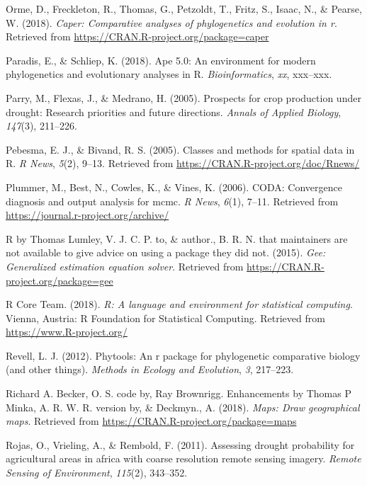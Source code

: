 \documentclass[man,floatsintext]{apa6}
\theoremstyle{definition}
\theoremstyle{definition}
\theoremstyle{definition}
\theoremstyle{remark}
\begin{document}
\leavevmode\hypertarget{ref-R-caper}{}%
Orme, D., Freckleton, R., Thomas, G., Petzoldt, T., Fritz, S., Isaac,
N., \& Pearse, W. (2018). \emph{Caper: Comparative analyses of
phylogenetics and evolution in r}. Retrieved from
\url{https://CRAN.R-project.org/package=caper}

\leavevmode\hypertarget{ref-R-ape}{}%
Paradis, E., \& Schliep, K. (2018). Ape 5.0: An environment for modern
phylogenetics and evolutionary analyses in R. \emph{Bioinformatics},
\emph{xx}, xxx--xxx.

\leavevmode\hypertarget{ref-parry2005prospects}{}%
Parry, M., Flexas, J., \& Medrano, H. (2005). Prospects for crop
production under drought: Research priorities and future directions.
\emph{Annals of Applied Biology}, \emph{147}(3), 211--226.

\leavevmode\hypertarget{ref-R-sp}{}%
Pebesma, E. J., \& Bivand, R. S. (2005). Classes and methods for spatial
data in R. \emph{R News}, \emph{5}(2), 9--13. Retrieved from
\url{https://CRAN.R-project.org/doc/Rnews/}

\leavevmode\hypertarget{ref-R-coda}{}%
Plummer, M., Best, N., Cowles, K., \& Vines, K. (2006). CODA:
Convergence diagnosis and output analysis for mcmc. \emph{R News},
\emph{6}(1), 7--11. Retrieved from
\url{https://journal.r-project.org/archive/}

\leavevmode\hypertarget{ref-R-gee}{}%
R by Thomas Lumley, V. J. C. P. to, \& author., B. R. N. that
maintainers are not available to give advice on using a package they did
not. (2015). \emph{Gee: Generalized estimation equation solver}.
Retrieved from \url{https://CRAN.R-project.org/package=gee}

\leavevmode\hypertarget{ref-R-base}{}%
R Core Team. (2018). \emph{R: A language and environment for statistical
computing}. Vienna, Austria: R Foundation for Statistical Computing.
Retrieved from \url{https://www.R-project.org/}

\leavevmode\hypertarget{ref-R-phytools}{}%
Revell, L. J. (2012). Phytools: An r package for phylogenetic
comparative biology (and other things). \emph{Methods in Ecology and
Evolution}, \emph{3}, 217--223.

\leavevmode\hypertarget{ref-R-maps}{}%
Richard A. Becker, O. S. code by, Ray Brownrigg. Enhancements by Thomas
P Minka, A. R. W. R. version by, \& Deckmyn., A. (2018). \emph{Maps:
Draw geographical maps}. Retrieved from
\url{https://CRAN.R-project.org/package=maps}

\leavevmode\hypertarget{ref-rojas2011assessing}{}%
Rojas, O., Vrieling, A., \& Rembold, F. (2011). Assessing drought
probability for agricultural areas in africa with coarse resolution
remote sensing imagery. \emph{Remote Sensing of Environment},
\emph{115}(2), 343--352.
\end{document}

